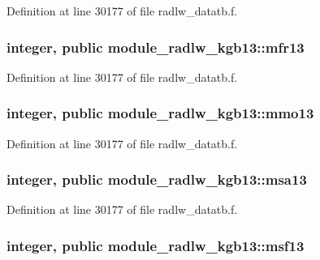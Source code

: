 Definition at line 30177 of file radlw\+\_\+datatb.\+f.

\subsubsection[{\texorpdfstring{mfr13}{mfr13}}]{\setlength{\rightskip}{0pt plus 5cm}integer, public module\+\_\+radlw\+\_\+kgb13\+::mfr13}\hypertarget{namespacemodule__radlw__kgb13_a158782c955af9f50aaefea2d49af97ce}{}\label{namespacemodule__radlw__kgb13_a158782c955af9f50aaefea2d49af97ce}


Definition at line 30177 of file radlw\+\_\+datatb.\+f.

\subsubsection[{\texorpdfstring{mmo13}{mmo13}}]{\setlength{\rightskip}{0pt plus 5cm}integer, public module\+\_\+radlw\+\_\+kgb13\+::mmo13}\hypertarget{namespacemodule__radlw__kgb13_ae513ce55829a57a0dbda77f570e4a619}{}\label{namespacemodule__radlw__kgb13_ae513ce55829a57a0dbda77f570e4a619}


Definition at line 30177 of file radlw\+\_\+datatb.\+f.

\subsubsection[{\texorpdfstring{msa13}{msa13}}]{\setlength{\rightskip}{0pt plus 5cm}integer, public module\+\_\+radlw\+\_\+kgb13\+::msa13}\hypertarget{namespacemodule__radlw__kgb13_a07932a22e5f8de248765a207e170ce6f}{}\label{namespacemodule__radlw__kgb13_a07932a22e5f8de248765a207e170ce6f}


Definition at line 30177 of file radlw\+\_\+datatb.\+f.

\subsubsection[{\texorpdfstring{msf13}{msf13}}]{\setlength{\rightskip}{0pt plus 5cm}integer, public module\+\_\+radlw\+\_\+kgb13\+::msf13}\hypertarget{namespacemodule__radlw__kgb13_a7f88590d2a9fc392b04e89fd3d4bf2bf}{}\label{namespacemodule__radlw__kgb13_a7f88590d2a9fc392b04e89fd3d4bf2bf}


